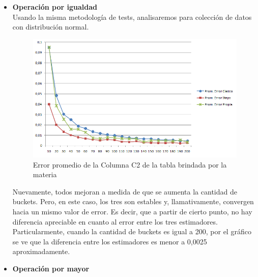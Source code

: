 \begin{itemize}
\item \textbf{Operaci\'on por igualdad} \\

\quad Usando la misma metodolog\'ia de tests, analisaremos para colecci\'on de datos con distribuci\'on normal. \\

\begin{figure}[H]
	  \begin{center}
	    \includegraphics[scale=.80]{imagenes/parametroVariableC2Eq.png}
	    \caption{Error promedio de la Columna C2 de la tabla brindada por la materia} 
	    \label{fig:C2_variando_paremetro}
	  \end{center}
\end{figure}

\quad Nuevamente, todos mejoran a medida de que se aumenta la cantidad de buckets. Pero, en este caso, los tres son estables y, llamativamente, convergen hacia un mismo valor de error. Es decir, que a partir de cierto punto, no hay diferencia apreciable en cuanto al error entre los tres estimadores. Particularmente, cuando la cantidad de buckets es igual a 200, por el gr\'afico se ve que la diferencia entre los estimadores es menor a 0,0025 aproximadamente.\\

\newpage

\item \textbf{Operaci\'on por mayor} \\


\end{itemize}
